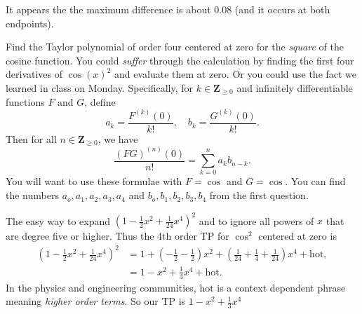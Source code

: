\documentclass[12pt,fleqn,answers]{exam}
\newcommand{\integers}{\mathbf{Z}}
\begin{document}
\begin{questions}
\begin{solution}
It appears the the maximum difference is about 0.08 (and it occurs at both endpoints).
\end{solution}


\question[2] Find the Taylor polynomial of order four centered at zero for the \emph{square} of the cosine function.  You could \emph{suffer}
through the calculation by finding the first four derivatives of $\cos(x)^2$ and evaluate them at zero. Or you could use the fact we learned
in class on Monday. Specifically, for $k \in \integers_{\geq 0}$ and infinitely differentiable functions $F$ and $G$, define
\begin{equation*}
   a_k = \frac{F^{(k)}(0)}{k!}, \quad 
   b_k = \frac{G^{(k)}(0)}{k!}.
\end{equation*}
Then for all $n \in \integers_{\geq 0}$, we have
\begin{equation*}
   \frac{ \left(F G\right)^{(n)}(0)}{n!} = \sum_{k=0}^n  a_k b_{n-k}.
\end{equation*}
You will want to use these formulae with $F = \cos$ and $G = \cos$.  You can find the numbers $a_o, a_1, a_2, a_3, a_4$ 
and $b_o, b_1, b_2, b_3, b_4$ from the 
first question. 


\begin{solution}
The easy way to expand $(1 - \frac{1}{2} x^2 + \frac{1}{24} x^4)^2$ and to ignore all powers of $x$ that are degree five
or higher. Thus the 4th order TP for $\cos^2$ centered at zero is
\begin{align*}
   (1 - \frac{1}{2} x^2  + \frac{1}{24} x^4)^2 &= 1 + (-\frac{1}{2} - \frac{1}{2}) x^2 + (\frac{1}{24} + \frac{1}{4} + 
   \frac{1}{24}) x^4 + \text{hot}, \\
      &= 1 - x^2 +  \frac{1}{3} x^4 +  \text{hot}.
\end{align*}
In the physics and engineering communities,  $\text{hot}$ is a context dependent phrase meaning \emph{higher order terms}.
So our TP is $1 - x^2  + \frac{1}{3} x^4 $
\end{solution}

\end{questions}
\end{document}
